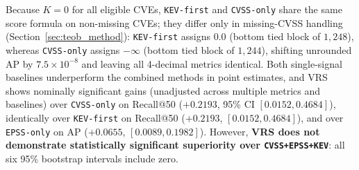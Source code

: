 \documentclass[conference]{IEEEtran}
\begin{document}
Because $K=0$ for all eligible CVEs, \texttt{KEV-first} and \texttt{CVSS-only} share the same score formula on non-missing CVEs; they differ only in missing-CVSS handling (Section~\ref{sec:teob_method}): \texttt{KEV-first} assigns $0.0$ (bottom tied block of $1{,}248$), whereas \texttt{CVSS-only} assigns $-\infty$ (bottom tied block of $1{,}244$), shifting unrounded AP by $7.5\times 10^{-8}$ and leaving all 4-decimal metrics identical. Both single-signal baselines underperform the combined methods in point estimates, and VRS shows nominally significant gains (unadjusted across multiple metrics and baselines) over \texttt{CVSS-only} on Recall@50 ($+0.2193$, 95\% CI $[0.0152, 0.4684]$), identically over \texttt{KEV-first} on Recall@50 ($+0.2193$, $[0.0152, 0.4684]$), and over \texttt{EPSS-only} on AP ($+0.0655$, $[0.0089, 0.1982]$). However, \textbf{VRS does not demonstrate statistically significant superiority over \texttt{CVSS+EPSS+KEV}}: all six 95\% bootstrap intervals include zero.
\end{document}
